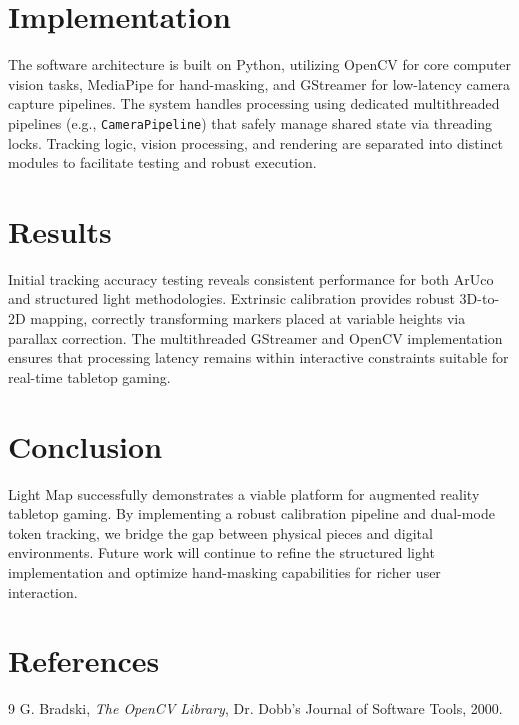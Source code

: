 \documentclass[11pt,a4paper]{article}
\begin{document}
\section{Implementation}

The software architecture is built on Python, utilizing OpenCV for core computer vision tasks, MediaPipe for hand-masking, and GStreamer for low-latency camera capture pipelines. The system handles processing using dedicated multithreaded pipelines (e.g., \texttt{CameraPipeline}) that safely manage shared state via threading locks. Tracking logic, vision processing, and rendering are separated into distinct modules to facilitate testing and robust execution.

\section{Results}

Initial tracking accuracy testing reveals consistent performance for both ArUco and structured light methodologies. Extrinsic calibration provides robust 3D-to-2D mapping, correctly transforming markers placed at variable heights via parallax correction. The multithreaded GStreamer and OpenCV implementation ensures that processing latency remains within interactive constraints suitable for real-time tabletop gaming.

\section{Conclusion}

Light Map successfully demonstrates a viable platform for augmented reality tabletop gaming. By implementing a robust calibration pipeline and dual-mode token tracking, we bridge the gap between physical pieces and digital environments. Future work will continue to refine the structured light implementation and optimize hand-masking capabilities for richer user interaction.

\section{References}

\begin{thebibliography}{9}
  G. Bradski,
  \textit{The OpenCV Library},
  Dr. Dobb's Journal of Software Tools, 2000.
\end{thebibliography}
\end{document}

